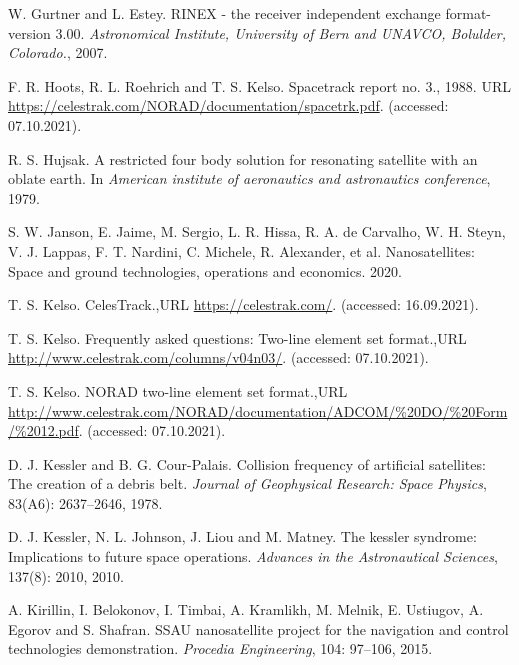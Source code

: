 \begin{CSLReferences}{1}{0}
\leavevmode{}%
W. Gurtner and L. Estey. RINEX - the receiver independent exchange format-version 3.00. \emph{Astronomical Institute, University of Bern and UNAVCO, Bolulder, Colorado.}, 2007.

\leavevmode{}%
F. R. Hoots, R. L. Roehrich and T. S. Kelso. Spacetrack report no. 3., 1988. URL \url{https://celestrak.com/NORAD/documentation/spacetrk.pdf}. (accessed: 07.10.2021).

\leavevmode{}%
R. S. Hujsak. A restricted four body solution for resonating satellite with an oblate earth. In \emph{American institute of aeronautics and astronautics conference}, 1979.

\leavevmode{}%
S. W. Janson, E. Jaime, M. Sergio, L. R. Hissa, R. A. de Carvalho, W. H. Steyn, V. J. Lappas, F. T. Nardini, C. Michele, R. Alexander, et al. Nanosatellites: Space and ground technologies, operations and economics. 2020.

\leavevmode{}%
T. S. Kelso. {CelesTrack}.,URL \url{https://celestrak.com/}. (accessed: 16.09.2021).

\leavevmode{}%
T. S. Kelso. Frequently asked questions: Two-line element set format.,URL \url{http://www.celestrak.com/columns/v04n03/}. (accessed: 07.10.2021).

\leavevmode{}%
T. S. Kelso. NORAD two-line element set format.,URL \url{http://www.celestrak.com/NORAD/documentation/ADCOM/\%20DO/\%20Form/\%2012.pdf}. (accessed: 07.10.2021).

\leavevmode{}%
D. J. Kessler and B. G. Cour-Palais. Collision frequency of artificial satellites: The creation of a debris belt. \emph{Journal of Geophysical Research: Space Physics}, 83(A6): 2637--2646, 1978.

\leavevmode{}%
D. J. Kessler, N. L. Johnson, J. Liou and M. Matney. The kessler syndrome: Implications to future space operations. \emph{Advances in the Astronautical Sciences}, 137(8): 2010, 2010.

\leavevmode{}%
A. Kirillin, I. Belokonov, I. Timbai, A. Kramlikh, M. Melnik, E. Ustiugov, A. Egorov and S. Shafran. SSAU nanosatellite project for the navigation and control technologies demonstration. \emph{Procedia Engineering}, 104: 97--106, 2015.


\end{CSLReferences}
